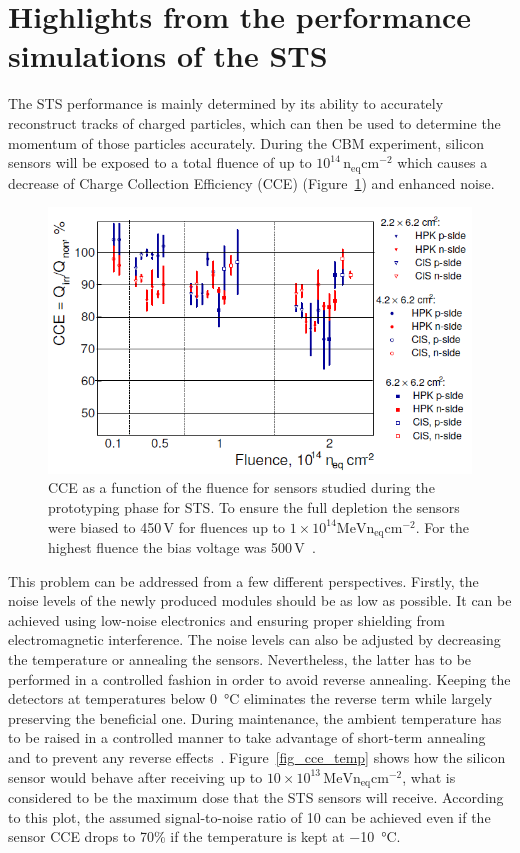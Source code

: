 \section{Highlights from the performance simulations of the STS}
The STS performance is mainly determined by its ability to accurately reconstruct tracks of charged particles, which can then be used to determine the momentum of those particles accurately. During the \gls{CBM} experiment, silicon sensors will be exposed to a total fluence of up to $10^{14}\,\mathrm{n_{eq}cm^{-2}}$ which causes a decrease of Charge Collection Efficiency (CCE) (Figure~\ref{fig_cce}) and enhanced noise. 

\begin{figure}[!h]
\centering
\includegraphics[width=0.8\columnwidth]{Chapter2/images/CCE.png}
\caption{CCE as a function of the fluence for sensors studied during the prototyping phase for \gls{STS}. To ensure the full depletion the sensors were biased to 450\,V for fluences up to $1\times10^14\mathrm{MeV n_{eq}cm^{-2}}$. For the highest fluence the bias voltage was 500\,V~\cite{Momot:2019lnx}.}
\label{fig_cce}
\end{figure}

This problem can be addressed from a few different perspectives. Firstly, the noise levels of the newly produced modules should be as low as possible. It can be achieved using low-noise electronics and ensuring proper shielding from electromagnetic interference. The noise levels can also be adjusted by decreasing the temperature or annealing the sensors. Nevertheless, the latter has to be performed in a controlled fashion in order to avoid reverse annealing. Keeping the detectors at temperatures below \SI{0}{\celsius} eliminates the reverse term while largely preserving the beneficial one. During maintenance, the ambient temperature has to be raised in a controlled manner to take advantage of short-term annealing and to prevent any reverse effects~\cite{Hartmann:2017gzy}. Figure~\ref{fig_cce_temp} shows how the silicon sensor would behave after receiving up to $10\times10^{13}\,\mathrm{MeV n_{eq}cm^{-2}}$, what is considered to be the maximum dose that the \gls{STS} sensors will receive. According to this plot, the assumed signal-to-noise ratio of 10 can be achieved even if the sensor \gls{CCE} drops to 70\% if the temperature is kept at \SI{-10}{\celsius}.

